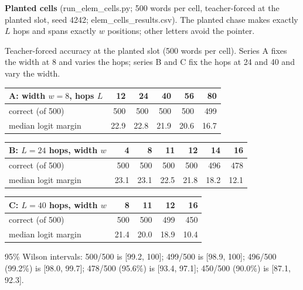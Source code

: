 \documentclass[paper=a4,fontsize=11pt,DIV=11,parskip=half,headings=small,numbers=noendperiod]{scrartcl}
\DeclareRobustCommand{\lead}[1]{\textsf{\bfseries\color{accent}#1}}
\DeclareRobustCommand{\code}[1]{{\fontseries{m}\ttfamily #1}}
\DeclareRobustCommand{\hdr}[1]{\textsf{\bfseries #1}}
\begin{document}
\lead{Planted cells} (\code{run\_\allowbreak{}elem\_\allowbreak{}cells.\allowbreak{}py}; 500 words per cell,
teacher-forced at the planted slot, seed 4242;
\code{elem\_\allowbreak{}cells\_\allowbreak{}results.\allowbreak{}csv}). The planted chase makes exactly $L$
hops and spans exactly $w$ positions; other letters avoid the pointer.

Teacher-forced accuracy at the planted slot (500 words per cell). Series A fixes the width at 8 and varies the
hops; series B and C fix the hops at 24 and 40 and vary the width.

\begin{center}\small
\begin{tabular}{@{}l *{5}{r}@{}}
\toprule
\hdr{A: width $w=8$, hops $L$} & \hdr{12} & \hdr{24} & \hdr{40} & \hdr{56} & \hdr{80} \\
\midrule
correct (of 500) & 500 & 500 & 500 & 500 & 499 \\
median logit margin & 22.9 & 22.8 & 21.9 & 20.6 & 16.7 \\
\bottomrule
\end{tabular}
\end{center}

\begin{center}\small
\begin{tabular}{@{}l *{6}{r}@{}}
\toprule
\hdr{B: $L=24$ hops, width $w$} & \hdr{4} & \hdr{8} & \hdr{11} & \hdr{12} & \hdr{14} & \hdr{16} \\
\midrule
correct (of 500) & 500 & 500 & 500 & 500 & 496 & 478 \\
median logit margin & 23.1 & 23.1 & 22.5 & 21.8 & 18.2 & 12.1 \\
\bottomrule
\end{tabular}
\end{center}

\begin{center}\small
\begin{tabular}{@{}l *{4}{r}@{}}
\toprule
\hdr{C: $L=40$ hops, width $w$} & \hdr{8} & \hdr{11} & \hdr{12} & \hdr{16} \\
\midrule
correct (of 500) & 500 & 500 & 499 & 450 \\
median logit margin & 21.4 & 20.0 & 18.9 & 10.4 \\
\bottomrule
\end{tabular}
\end{center}

95\% Wilson intervals: 500/500 is [99.2, 100]; 499/500 is [98.9, 100]; 496/500 (99.2\%) is [98.0, 99.7]; 478/500
(95.6\%) is [93.4, 97.1]; 450/500 (90.0\%) is [87.1, 92.3].
\end{document}
